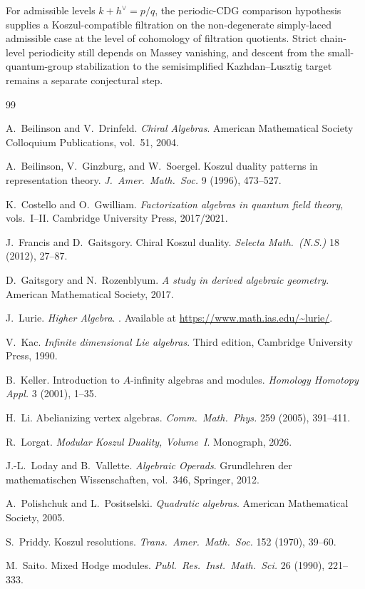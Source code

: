 \documentclass[11pt,reqno]{amsart}
\theoremstyle{definition}
\theoremstyle{remark}
\numberwithin{equation}{section}
\begin{document}
For admissible levels $k+h^\vee=p/q$, the periodic-CDG comparison
hypothesis supplies a Koszul-compatible filtration on the
non-degenerate simply-laced admissible case at the level of
cohomology of filtration quotients.
Strict chain-level periodicity still depends on Massey vanishing,
and descent from the small-quantum-group stabilization to the
semisimplified Kazhdan--Lusztig target remains a separate
conjectural step.

\begin{thebibliography}{99}

A.~Beilinson and V.~Drinfeld.
\newblock \emph{Chiral Algebras}.
\newblock American Mathematical Society Colloquium Publications,
 vol.~51, 2004.

A.~Beilinson, V.~Ginzburg, and W.~Soergel.
\newblock Koszul duality patterns in representation theory.
\newblock \emph{J.~Amer.~Math.~Soc.} 9 (1996), 473--527.

K.~Costello and O.~Gwilliam.
\newblock \emph{Factorization algebras in quantum field theory},
 vols.~I--II.
\newblock Cambridge University Press, 2017/2021.

J.~Francis and D.~Gaitsgory.
\newblock Chiral Koszul duality.
\newblock \emph{Selecta Math.~(N.S.)} 18 (2012), 27--87.

D.~Gaitsgory and N.~Rozenblyum.
\newblock \emph{A study in derived algebraic geometry}.
\newblock American Mathematical Society, 2017.

J.~Lurie.
\newblock \emph{Higher Algebra}.
. Available at
 \url{https://www.math.ias.edu/~lurie/}.

V.~Kac.
\newblock \emph{Infinite dimensional Lie algebras}.
\newblock Third edition, Cambridge University Press, 1990.

B.~Keller.
\newblock Introduction to $A$-infinity algebras and modules.
\newblock \emph{Homology Homotopy Appl.} 3 (2001), 1--35.

H.~Li.
\newblock Abelianizing vertex algebras.
\newblock \emph{Comm.~Math.~Phys.} 259 (2005), 391--411.

R.~Lorgat.
\newblock \emph{Modular Koszul Duality, Volume~I}.
\newblock Monograph, 2026.

J.-L.~Loday and B.~Vallette.
\newblock \emph{Algebraic Operads}.
\newblock Grundlehren der mathematischen Wissenschaften,
 vol.~346, Springer, 2012.

A.~Polishchuk and L.~Positselski.
\newblock \emph{Quadratic algebras}.
\newblock American Mathematical Society, 2005.

S.~Priddy.
\newblock Koszul resolutions.
\newblock \emph{Trans.~Amer.~Math.~Soc.} 152 (1970), 39--60.

M.~Saito.
\newblock Mixed Hodge modules.
\newblock \emph{Publ.~Res.~Inst.~Math.~Sci.} 26 (1990), 221--333.

\end{thebibliography}
\end{document}
